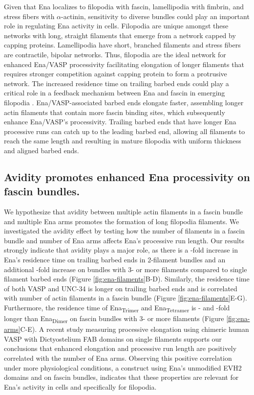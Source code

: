 Given that Ena localizes to filopodia with fascin, lamellipodia with fimbrin, and stress fibers with $\alpha$-actinin, sensitivity to diverse bundles could play an important role in regulating Ena activity in cells. Filopodia are unique amongst these networks with long, straight filaments that emerge from a network capped by capping proteins. Lamellipodia have short, branched filaments and stress fibers are contractile, bipolar networks. Thus, filopodia are the ideal network for enhanced Ena/VASP processivity facilitating elongation of longer filaments that requires stronger competition against capping protein to form a protrusive network. The increased residence time on trailing barbed ends could play a critical role in a feedback mechanism between Ena and fascin in emerging filopodia \citep{winkelman_ena/vasp_2014}. Ena/VASP-associated barbed ends elongate faster, assembling longer actin filaments that contain more fascin binding sites, which subsequently enhance Ena/VASP's processivity. Trailing barbed ends that have longer Ena processive runs can catch up to the leading barbed end, allowing all filaments to reach the same length and resulting in mature filopodia with uniform thickness and aligned barbed ends.
 
\subsection{Avidity promotes enhanced Ena processivity on fascin bundles.}\label{avidity-processivity}

We hypothesize that avidity between multiple actin filaments in a fascin bundle and multiple Ena arms promotes the formation of long filopodia filaments. We investigated the avidity effect by testing how the number of filaments in a fascin bundle and number of Ena arms affects Ena's processive run length. Our results strongly indicate that avidity plays a major role, as there is a -fold increase in Ena's residence time on trailing barbed ends in 2-filament bundles and an additional -fold increase on bundles with 3- or more filaments compared to single filament barbed ends (Figure \ref{fig:ena-filaments}B-D). Similarly, the residence time of both VASP and UNC-34 is longer on trailing barbed ends and is correlated with number of actin filaments in a fascin bundle (Figure \ref{fig:ena-filaments}E-G). Furthermore, the residence time of Ena\textsubscript{Trimer} and Ena\textsubscript{Tetramer} is - and -fold longer than Ena\textsubscript{Dimer} on fascin bundles with 3- or more filaments (Figure \ref{fig:ena-arms}C-E). A recent study measuring processive elongation using chimeric human VASP with Dictyostelium FAB domains on single filaments \citep{bruhmann_distinct_2017} supports our conclusions that enhanced elongation and processive run length are positively correlated with the number of Ena arms. Observing this positive correlation under more physiological conditions, a construct using Ena's unmodified EVH2 domains and on fascin bundles, indicates that these properties are relevant for Ena's activity in cells and specifically for filopodia. 

